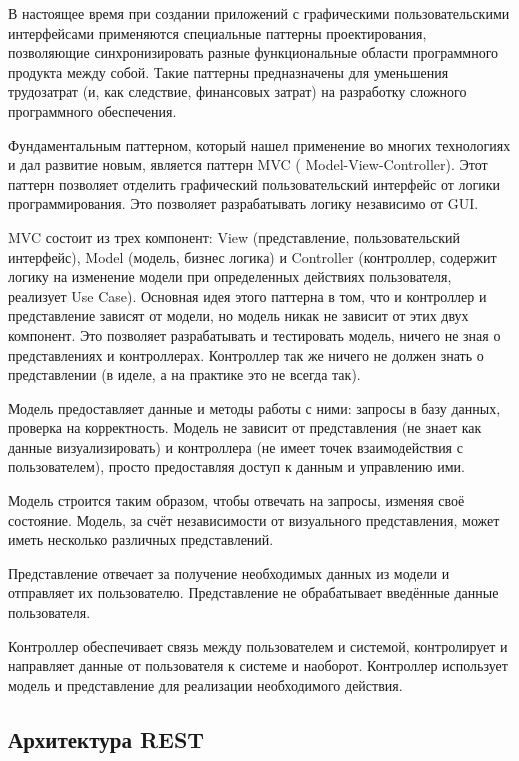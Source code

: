 \documentclass[a4paper,14pt]{article}
\begin{document}
В настоящее время при создании приложений с графическими пользовательскими интерфейсами применяются специальные паттерны проектирования, позволяющие синхронизировать разные функциональные области программного продукта между собой. Такие паттерны предназначены для уменьшения трудозатрат (и, как следствие, финансовых затрат) на разработку сложного программного обеспечения.

Фундаментальным паттерном, который нашел применение во многих технологиях и дал развитие новым, является паттерн MVC ( Model-View-Controller). Этот паттерн позволяет отделить графический пользовательский интерфейс от логики программирования. Это позволяет разрабатывать логику независимо от GUI.

MVC состоит из трех компонент: View (представление, пользовательский интерфейс), Model (модель, бизнес логика) и Controller (контроллер, содержит логику на изменение модели при определенных действиях пользователя, реализует Use Case). Основная идея этого паттерна в том, что и контроллер и представление зависят от модели, но модель никак не зависит от этих двух компонент. Это позволяет разрабатывать и тестировать модель, ничего не зная о представлениях и контроллерах. Контроллер так же ничего не должен знать о представлении (в иделе, а на практике это не всегда так).

Модель предоставляет данные и методы работы с ними: запросы в базу данных, проверка на корректность. Модель не зависит от представления (не знает как данные визуализировать) и контроллера (не имеет точек взаимодействия с пользователем), просто предоставляя доступ к данным и управлению ими.

Модель строится таким образом, чтобы отвечать на запросы, изменяя своё состояние. Модель, за счёт независимости от визуального представления, может иметь несколько различных представлений.

Представление отвечает за получение необходимых данных из модели и отправляет их пользователю. Представление не обрабатывает введённые данные пользователя.

Контроллер обеспечивает связь между пользователем и системой, контролирует и направляет данные от пользователя к системе и наоборот. Контроллер использует модель и представление для реализации необходимого действия. 

\subsection{Архитектура REST}
\end{document}
